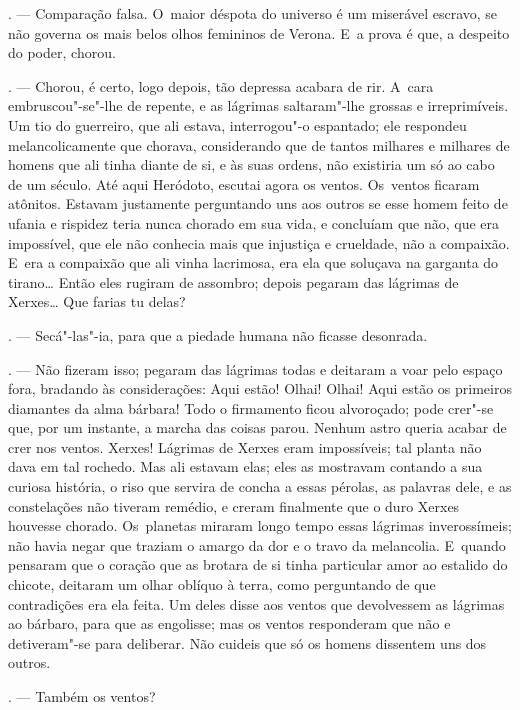 \begin{linenumbers}
\begin{Parskip}
. --- Comparação falsa. O~maior déspota do universo é um miserável
escravo, se não governa os mais belos olhos femininos de Verona. E~a
prova é que, a despeito do poder, chorou.

. --- Chorou, é certo, logo depois, tão depressa acabara de
rir. A~cara embruscou"-se"-lhe de repente, e as lágrimas saltaram"-lhe
grossas e irreprimíveis. Um tio do guerreiro, que ali estava,
interrogou"-o espantado; ele respondeu melancolicamente que chorava,
considerando que de tantos milhares e milhares de homens que ali tinha
diante de si, e às suas ordens, não existiria um só ao cabo de um
século. Até aqui Heródoto, escutai agora os ventos. Os~ventos ficaram
atônitos. Estavam justamente perguntando uns aos outros se esse homem
feito de ufania e rispidez teria nunca chorado em sua vida, e concluíam
que não, que era impossível, que ele não conhecia mais que injustiça e
crueldade, não a compaixão. E~era a compaixão que ali vinha lacrimosa,
era ela que soluçava na garganta do tirano\ldots{} Então eles rugiram de
assombro; depois pegaram das lágrimas de Xerxes\ldots{} Que farias tu delas?

. --- Secá"-las"-ia, para que a piedade humana não ficasse desonrada.

. --- Não fizeram isso; pegaram das lágrimas todas e
deitaram a voar pelo espaço fora, bradando às considerações: Aqui estão!
Olhai! Olhai! Aqui estão os primeiros diamantes da alma bárbara! Todo o
firmamento ficou alvoroçado; pode crer"-se que, por um instante, a marcha
das coisas parou. Nenhum astro queria acabar de crer nos ventos. Xerxes!
Lágrimas de Xerxes eram impossíveis; tal planta não dava em tal rochedo.
Mas ali estavam elas; eles as mostravam contando a sua curiosa história,
o riso que servira de concha a essas pérolas, as palavras dele, e as
constelações não tiveram remédio, e creram finalmente que o duro Xerxes
houvesse chorado. Os~planetas miraram longo tempo essas lágrimas
inverossímeis; não havia negar que traziam o amargo da dor e o travo da
melancolia. E~quando pensaram que o coração que as brotara de si tinha
particular amor ao estalido do chicote, deitaram um olhar oblíquo à
terra, como perguntando de que contradições era ela feita. Um deles
disse aos ventos que devolvessem as lágrimas ao bárbaro, para que as
engolisse; mas os ventos responderam que não e detiveram"-se para
deliberar. Não cuideis que só os homens dissentem uns dos outros.

. --- Também os ventos?


\end{Parskip}
\end{linenumbers}
